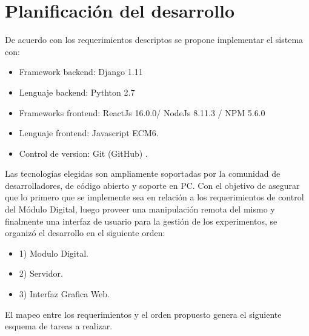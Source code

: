 \section{Planificaci\'on del desarrollo}


De acuerdo con los requerimientos descriptos se propone implementar el sistema con:

\begin{itemize}
    \item Framework backend: Django 1.11
    \item Lenguaje backend: Pythton 2.7
    \item Frameworks frontend: ReactJs 16.0.0\cite{create_react_app}/ NodeJs 8.11.3 / NPM 5.6.0
    \item Lenguaje frontend: Javascript ECM6.
    \item Control de version: Git (GitHub)\cite{github} .
\end{itemize}
Las tecnolog\'ias elegidas son ampliamente soportadas por la comunidad de desarrolladores, de c\'odigo abierto y soporte en PC. Con el objetivo de asegurar que lo primero que se implemente sea en relaci\'on a los requerimientos 
de control del M\'odulo Digital, luego proveer una manipulaci\'on remota del mismo y finalmente una interfaz de
usuario para la gesti\'on de los experimentos, se organiz\'o el desarrollo en el siguiente orden:
\begin{itemize}
    \item 1) Modulo Digital.
    \item 2) Servidor.
    \item 3) Interfaz Grafica Web.
\end{itemize}
El mapeo entre los requerimientos y el orden propuesto genera el siguiente esquema de tareas a realizar.
